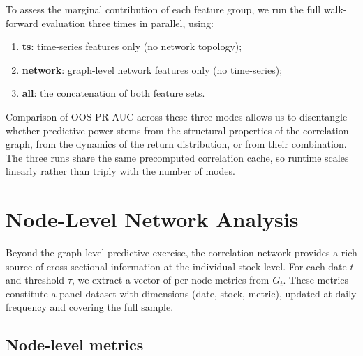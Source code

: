 \documentclass{article}
\begin{document}
To assess the marginal contribution of each feature group, we run the full walk-forward evaluation three times in parallel, using:
\begin{enumerate}
    \item \textbf{ts}: time-series features only (no network topology);
    \item \textbf{network}: graph-level network features only (no time-series);
    \item \textbf{all}: the concatenation of both feature sets.
\end{enumerate}

Comparison of OOS PR-AUC across these three modes allows us to disentangle whether predictive power stems from the structural properties of the correlation graph, from the dynamics of the return distribution, or from their combination. The three runs share the same precomputed correlation cache, so runtime scales linearly rather than triply with the number of modes.

\section{Node-Level Network Analysis}
\label{sec:node_features}

Beyond the graph-level predictive exercise, the correlation network provides a rich source of cross-sectional information at the individual stock level. For each date $t$ and threshold $\tau$, we extract a vector of per-node metrics from $G_t$. These metrics constitute a panel dataset with dimensions (date, stock, metric), updated at daily frequency and covering the full sample.

\subsection{Node-level metrics}
\end{document}
